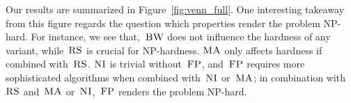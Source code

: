 

Our results are summarized in
Figure~\ref{fig:venn_full}.
One interesting takeaway from this figure regards
the question which properties render the problem
NP-hard. For instance, we see that,~$\textsc{BW}$
does not influence the hardness of any variant,
while~$\textsc{RS}$ is crucial for NP-hardness.
$\textsc{MA}$ only affects hardness if combined with~$\textsc{RS}$.
$\textsc{NI}$ is trivial without~$\textsc{FP}$, and~$\textsc{FP}$ requires
more sophisticated algorithms when combined with~$\textsc{NI}$ or~$\textsc{MA}$;
in combination with~$\textsc{RS}$ and~$\textsc{MA}$ or~$\textsc{NI}$,~$\textsc{FP}$ renders the
problem NP-hard.

